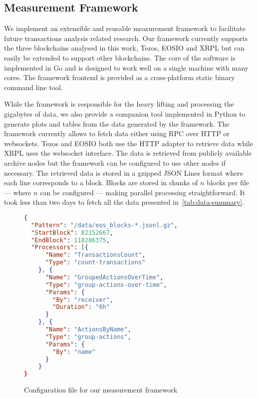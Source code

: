 \subsection{Measurement Framework}
We implement an extensible and reusable measurement framework to facilitate future transactions analysis related research.
Our framework currently supports the three blockchains analysed in this work, Tezos, EOSIO and XRPL but can easily be extended to support other blockchains.
The core of the software is implemented in Go and is designed to work well on a single machine with many cores.
The framework frontend is provided as a cross-platform static binary command line tool.

While the framework is responsible for the heavy lifting and processing the gigabytes of data, we also provide a companion tool implemented in Python to generate plots and tables from the data generated by the framework.
The framework currently allows to fetch data either using RPC over HTTP or websockets.
Tezos and EOSIO both use the HTTP adapter to retrieve data while XRPL uses the websocket interface.
The data is retrieved from publicly available archive nodes but the framework can be configured to use other nodes if necessary.
The retrieved data is stored in a gzipped JSON Lines format where each line corresponds to a block. Blocks are stored in chunks of $n$ blocks per file --- where $n$ can be configured --- making parallel processing straightforward. It took less than two days to fetch all the data presented in~\autoref{tab:data-summary}.

\begin{figure}[h!]
\begin{lstlisting}[language=json]
{
  "Pattern": "/data/eos_blocks-*.jsonl.gz",
  "StartBlock": 82152667,
  "EndBlock": 118286375,
  "Processors": [{
      "Name": "TransactionsCount",
      "Type": "count-transactions"
    }, {
      "Name": "GroupedActionsOverTime",
      "Type": "group-actions-over-time",
      "Params": {
        "By": "receiver",
        "Duration": "6h"
      }
    }, {
      "Name": "ActionsByName",
      "Type": "group-actions",
      "Params": {
        "By": "name"
      }
    }
}
\end{lstlisting}
  \caption{Configuration file for our measurement framework}
  \label{lis:framework-config}
\end{figure}

